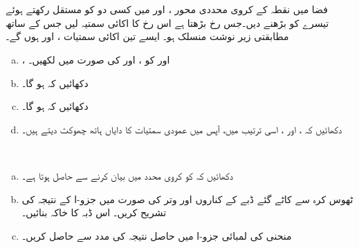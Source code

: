 \\
\\
فضا میں نقطہ  کے کروی محددی  محور    ،  اور  میں کسی دو کو مستقل رکھتے ہوئے  تیسرے کو بڑھنے دیں۔جس رخ  بڑھتا ہے اس رخ    کا  اکائی سمتیہ  لیں  جس  کے ساتھ مطابقتی زیر نوشت   منسلک ہو۔ ایسے تین اکائی سمتیات ،  اور  ہوں گے۔
\begin{enumerate}[a.]
\item
{}،  اور  کو ،  اور  کی صورت میں لکھیں۔
\item
دکھائیں کہ  ہو گا۔
\item
دکھائیں کہ  ہو گا۔
\item
دکھائیں کہ ،  اور ، اسی ترتیب میں، آپس میں عمودی سمتیات کا دایاں ہاتھ  چھوکٹ دیتے ہیں۔
\end{enumerate}
\\
\begin{enumerate}[a.]
\item
دکھائیں کہ   کو  کروی  محدد میں بیان کرنے سے  حاصل ہوتا ہے۔
\item
ٹھوس کرہ سے کاٹے گئے ڈبے کے کناروں اور وتر  کی صورت میں جزو-ا کے نتیجہ کی تشریح کریں۔ اس ڈبہ کا خاکہ بنائیں۔
\item
منحنی  کی لمبائی جزو-ا میں حاصل نتیجہ کی مدد سے حاصل کریں۔
\end{enumerate}


